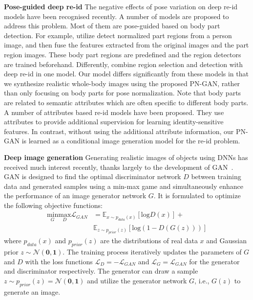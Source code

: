 \documentclass[10pt,letterpaper,twocolumn,10pt,letterpaper,twocolumn]{article}
\begin{document}
\noindent \textbf{Pose-guided deep re-id} \quad{}The negative effects
of pose variation on deep re-id models have been recognised recently.
A number of models \cite{su2017pose,zheng2017pose,zhao2017deeply,zhao2017spindle,li2017learning,yao2017deep,wei2017glad}
are proposed to address this problem. Most of them are pose-guided
based on body part detection. For example, \cite{su2017pose,zhao2017spindle}
utilize detect normalized part regions from a person image, and then
fuse the features extracted from the original images and the part
region images. These body part regions are predefined and the region
detectors are trained beforehand. Differently, \cite{zhao2017deeply}
combine region selection and detection with deep re-id in one model.
Our model differs significantly from these models in that we synthesize
realistic whole-body images using the proposed PN-GAN, rather than
only focusing on body parts for pose normalization. Note that body
parts are related to semantic attributes which are often specific to
different body parts. A number of attributes based re-id models \cite{wang2017attribute,sarfraz2017deep,yu2016weakly,deng2015learning}
have been proposed. They use attributes to provide additional supervision
for learning identity-sensitive features. In contrast, without using
the additional attribute information,  our PN-GAN is learned 
as a conditional image generation model for the re-id problem. 

\noindent \textbf{Deep image generation} \quad{}Generating realistic
images of objects using DNNs has received much interest recently,
thanks largely to the development of GAN~\cite{goodfellow2014generative}.
GAN is designed to find the optimal discriminator network $D$ between
training data and generated samples using a min-max game and simultaneously
enhance the performance of an image generator network $G$. It is
formulated to optimize the following objective functions: 
\begin{align}
\underset{G}{\mathrm{min}}\underset{D}{\mathrm{max}}\mathcal{L}_{GAN} & =\mathbb{E}_{x\sim p_{data}\left(x\right)}\left[\mathrm{log}D\left(x\right)\right]+\label{eq:gan}\\
 & \mathbb{E}_{z\sim p_{prior}\left(z\right)}\left[\mathrm{log}\left(1-D\left(G\left(z\right)\right)\right)\right]\nonumber 
\end{align}
where $p_{data}\left(x\right)$ and $p_{prior}\left(z\right)$ are
the distributions of real data $x$ and Gaussian prior $z\sim\mathcal{N}\left(\mathbf{0},\mathbf{1}\right)$.
The training process iteratively updates the parameters of $G$ and
$D$ with the loss functions $\mathcal{L}_{D}=-\mathcal{L}_{GAN}$
and $\mathcal{L}_{G}=\mathcal{L}_{GAN}$ for the generator and discriminator
respectively. The generator can draw a sample $z\sim p_{prior}\left(z\right)=\mathcal{N}\left(\mathbf{0},\mathbf{1}\right)$
and utilize the generator network $G$, i.e., $G(z)$ to generate
an image.
\end{document}
